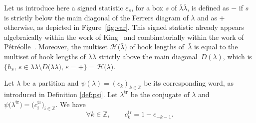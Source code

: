 \documentclass[10pt,a4paper]{amsart}
\numberwithin{equation}{section}
\def\cch{\mathcal H}
\def\ccsc{\mathcal {SC}}
\def\ccdd{\mathcal {DD}}
\def\ccd{\mathcal {D}}
\newcommand{\Z}{\mathbb{Z}}
\begin{document}
Let us introduce here a signed statistic \textit{$\varepsilon_s$}, for a box $s$ of $\bar{\lambda}\bar{\lambda}$, is defined as $-$ if $s$ is strictly below the main diagonal of the Ferrers diagram of $\lambda$ and as $+$ otherwise, as depicted in Figure~\ref{fig:var}. This signed statistic already appears algebraically within the work of King~\cite{King} and combinatorially within the work of P\'etr\'eolle~\cite{MP}.
Moreover, the multiset $\cch\bigl(\bar{\lambda}\bigr)$ of hook lengths of~$\bar{\lambda}$ is equal to the multiset of hook lengths of $\bar{\lambda}\bar{\lambda}$ strictly above the main diagonal~$D(\lambda)$, which is~${\bigl\lbrace h_s,\, s\in\bar{\lambda}\bar{\lambda}\setminus D\bigl(\bar{\lambda}\bar{\lambda}\bigr),\,\varepsilon=+\bigr\rbrace=\cch\bigl(\bar{\lambda}\bigr)}$.

\begin{Remark}\label{rem:conju}
Let $\lambda$ be a partition and $\psi(\lambda)=(c_k)_{k\in\Z}$ be its corresponding word, as introduced in Definition \ref{def:psi}. Let $\lambda^{\mathrm{tr}}$ be the conjugate of $\lambda$ and $\psi\bigl(\lambda^{\mathrm{tr}}\bigr)=\bigl(c^{\mathrm{tr}}_i\bigr)_{i\in\Z}$. We have
\[\forall k\in\Z,\qquad
 c^{\mathrm{tr}}_k=1-c_{-k-1}.\]
\end{Remark}
\end{document}
